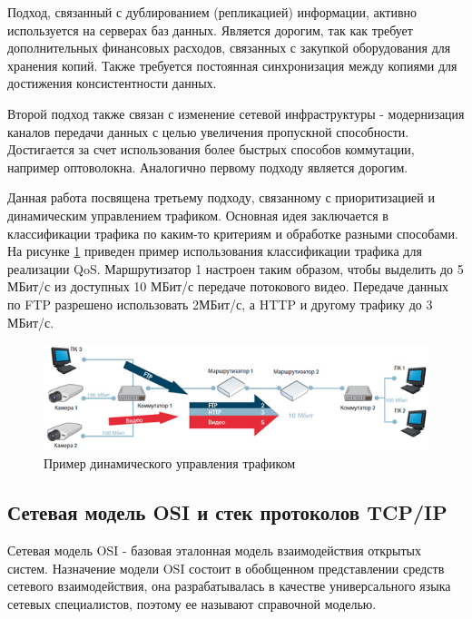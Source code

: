 Подход, связанный с дублированием (репликацией) информации, активно используется на серверах баз данных. Является дорогим, так как требует дополнительных финансовых расходов, связанных с закупкой оборудования для хранения копий. Также требуется постоянная синхронизация между копиями для достижения консистентности данных.

Второй подход также связан с изменение сетевой инфраструктуры - модернизация каналов передачи данных с целью увеличения пропускной способности. Достигается за счет использования более быстрых способов коммутации, например оптоволокна. Аналогично первому подходу является дорогим.

Данная работа посвящена третьему подходу, связанному с приоритизацией и динамическим управлением трафиком. Основная идея заключается в классификации трафика по каким-то критериям и обработке разными способами. На рисунке \ref{pic:qos_simple_example} приведен пример использования классификации трафика для реализации QoS. Маршрутизатор 1 настроен таким образом, чтобы выделить до 5 МБит/с из доступных 10 МБит/с передаче потокового видео. Передаче данных по FTP разрешено использовать 2МБит/с, а HTTP и другому трафику до 3 МБит/с.
\begin{figure}
\centering
\includegraphics[scale=0.7]{pictures/qos_simple_example}
\caption{Пример динамического управления трафиком}
\label{pic:qos_simple_example}
\end{figure}

\subsection{Сетевая модель OSI и стек протоколов TCP/IP}
Сетевая модель OSI - базовая эталонная модель взаимодействия открытых систем. Назначение модели OSI состоит в обобщенном представлении средств сетевого взаимодействия, она разрабатывалась в качестве универсального языка сетевых специалистов, поэтому ее называют справочной моделью.

